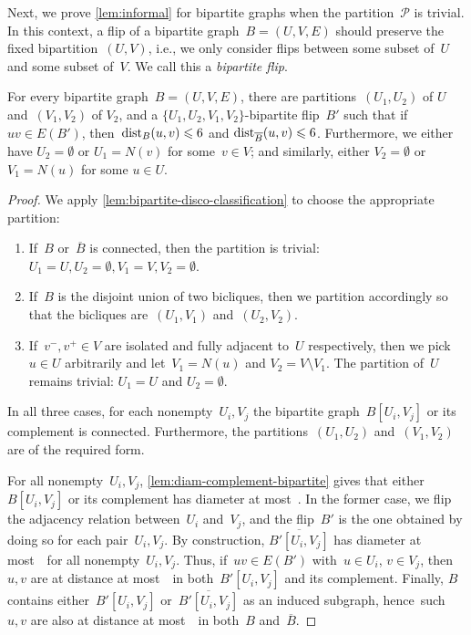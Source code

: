 \documentclass[a4paper,UKenglish,cleveref, autoref, thm-restate]{lipics-v2021}
\newcommand{\dist}{\textnormal{dist}}
\newcommand{\PP}{\mathcal{P}}
\renewcommand{\le}{\leqslant}
\begin{document}
Next, we prove \cref{lem:informal} for bipartite graphs when the partition~$\PP$ is trivial.
In this context, a flip of a bipartite graph~$B = (U,V,E)$ should preserve the fixed bipartition~$(U,V)$,
i.e., we only consider flips between some subset of~$U$ and some subset of~$V$.
We call this a \emph{bipartite flip}.
\begin{lemma}
  \label{lem:informal-bipartite}
  For every bipartite graph~$B = (U,V,E)$, there are partitions~$(U_1,U_2)$ of $U$ and~$(V_1,V_2)$ of $V_2$,
  and a $\{U_1,U_2,V_1,V_2\}$-bipartite flip~$B'$ such that if~$uv \in E(B')$, then~$\dist_B(u,v) \le \diamBoundBip$ and $\dist_{\overline{B}}(u,v) \le \diamBoundBip$.
  Furthermore, we either have $U_2=\emptyset$ or $U_1 = N(v)$ for some~$v \in V$; and similarly, either $V_2=\emptyset$ or $V_1=N(u)$ for some $u\in U$.
\end{lemma}
\begin{proof}
  We apply \cref{lem:bipartite-disco-classification} to choose the appropriate partition:
  \begin{enumerate}
    \item If~$B$ or~$\overline{B}$ is connected, then the partition is trivial: $U_1 = U, U_2=\emptyset, V_1 = V, V_2=\emptyset$.
    \item If~$B$ is the disjoint union of two bicliques, then we partition accordingly so that the bicliques are~$(U_1,V_1)$ and~$(U_2,V_2)$.
    \item If~$v^-,v^+ \in V$ are isolated and fully adjacent to~$U$ respectively,
      then we pick~$u \in U$ arbitrarily and let~$V_1 = N(u)$ and $V_2 = V \setminus V_1$. The partition of~$U$ remains trivial: $U_1 = U$ and $U_2=\emptyset$.
  \end{enumerate}
  In all three cases, for each nonempty~$U_i,V_j$ the bipartite graph~$B[U_i,V_j]$ or its complement is connected.
  Furthermore, the partitions~$(U_1,U_2)$ and~$(V_1,V_2)$ are of the required form.

  For all nonempty~$U_i,V_j$, \cref{lem:diam-complement-bipartite} gives that either~$B[U_i,V_j]$ or its complement has diameter at most~\diamBoundBip.
  In the former case, we flip the adjacency relation between~$U_i$ and~$V_j$,
  and the flip~$B'$ is the one obtained by doing so for each pair~$U_i,V_j$.
  By construction, $\overline{B'[U_i,V_j]}$ has diameter at most~\diamBoundBip~for all nonempty~$U_i,V_j$.
  Thus, if~$uv \in E(B')$ with~$u \in U_i$, $v \in V_j$, then~$u,v$ are at distance at most~\diamBoundBip~in both~$B'[U_i,V_j]$ and its complement.
  Finally, $B$ contains either~$B'[U_i,V_j]$ or~$\overline{B'[U_i,V_j]}$ as an induced subgraph,
  hence~such $u,v$ are also at distance at most~\diamBoundBip~in both~$B$ and~$\overline{B}$.
\end{proof}
\end{document}
